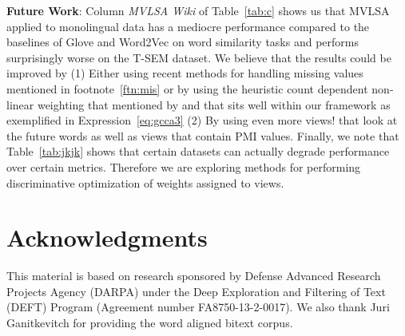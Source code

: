 \documentclass[11pt]{article}
\begin{document}
\noindent\textbf{Future Work}: Column \emph{MVLSA Wiki} of
Table~\ref{tab:c} shows us that MVLSA applied to monolingual data has
a mediocre performance  compared to the baselines of Glove and
Word2Vec on word similarity tasks and performs surprisingly worse on
the T-SEM dataset. We believe that the results could be improved by (1)
Either using recent methods for handling missing values
mentioned in footnote~\ref{ftn:mis} or by using the heuristic count dependent
non-linear weighting that mentioned by 
and that sits well within our framework as exemplified in Expression~\ref{eq:gcca3}
 (2) By using even more views! that
look at the future words as well as views that contain PMI values. 
Finally, we note that Table~\ref{tab:jkjk} shows that certain datasets can
actually degrade performance over certain metrics. Therefore we are
exploring methods for performing discriminative optimization of weights
assigned to views.


\section*{Acknowledgments}
This material is based on research sponsored by Defense Advanced Research
Projects Agency (DARPA) under the Deep Exploration and
Filtering of Text (DEFT) Program (Agreement number
FA8750-13-2-0017). We also thank Juri Ganitkevitch for 
providing the word aligned bitext corpus.



\end{document}

